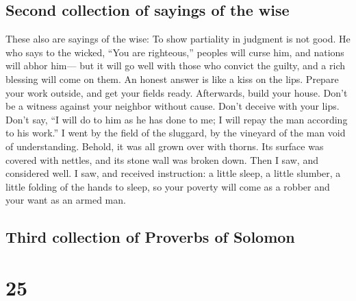 \hypertarget{second-collection-of-sayings-of-the-wise}{%
\subsection{Second collection of sayings of the
wise}\label{second-collection-of-sayings-of-the-wise}}

 These also are sayings of the wise: To show partiality
in judgment is not good.  He who says to the wicked,
``You are righteous,'' peoples will curse him, and nations will abhor
him---  but it will go well with those who convict the
guilty, and a rich blessing will come on them.  An honest
answer is like a kiss on the lips.  Prepare your work
outside, and get your fields ready. Afterwards, build your house.
 Don't be a witness against your neighbor without cause.
Don't deceive with your lips.  Don't say, ``I will do to
him as he has done to me; I will repay the man according to his work.''
 I went by the field of the sluggard, by the vineyard of
the man void of understanding.  Behold, it was all grown
over with thorns. Its surface was covered with nettles, and its stone
wall was broken down.  Then I saw, and considered well. I
saw, and received instruction:  a little sleep, a little
slumber, a little folding of the hands to sleep,  so your
poverty will come as a robber and your want as an armed man.

\hypertarget{third-collection-of-proverbs-of-solomon}{%
\subsection{Third collection of Proverbs of
Solomon}\label{third-collection-of-proverbs-of-solomon}}

\hypertarget{section-24}{%
\section{25}\label{section-24}}

